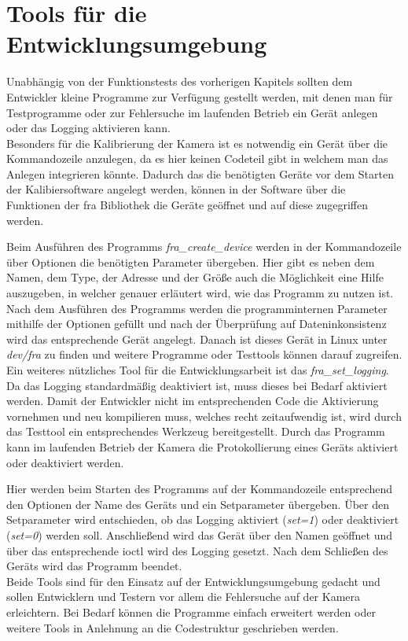  
\section{Tools für die Entwicklungsumgebung}
Unabhängig von der Funktionstests des vorherigen Kapitels sollten dem Entwickler kleine Programme zur Verfügung gestellt werden, mit denen man für Testprogramme oder zur Fehlersuche im laufenden Betrieb ein Gerät anlegen oder das Logging aktivieren kann.\\


Besonders für die Kalibrierung der Kamera ist es notwendig ein Gerät über die Kommandozeile anzulegen, da es hier keinen Codeteil gibt in welchem man das Anlegen integrieren könnte. Dadurch das die benötigten Geräte vor dem Starten der Kalibiersoftware angelegt werden, können in der Software über die Funktionen der \ac{fra} Bibliothek die Geräte geöffnet und auf diese zugegriffen werden.


Beim Ausführen des Programms \textit{fra\_create\_device} werden in der Kommandozeile über Optionen die benötigten Parameter übergeben. Hier gibt es neben dem Namen, dem Type, der Adresse und der Größe auch die Möglichkeit eine Hilfe auszugeben, in welcher genauer erläutert wird, wie das Programm zu nutzen ist. 
Nach dem Ausführen des Programms werden die programminternen Parameter mithilfe der Optionen gefüllt und nach der Überprüfung auf Dateninkonsistenz wird das entsprechende Gerät angelegt. 
Danach ist dieses Gerät in Linux unter \textit{dev/fra} zu finden und weitere Programme oder Testtools können darauf zugreifen.\\

Ein weiteres nützliches Tool für die Entwicklungsarbeit ist das \textit{fra\_set\_logging}. Da das Logging standardmäßig deaktiviert ist, muss dieses bei Bedarf aktiviert werden. Damit der Entwickler nicht im entsprechenden Code die Aktivierung vornehmen und neu kompilieren muss, welches recht zeitaufwendig ist, wird durch das Testtool ein entsprechendes Werkzeug bereitgestellt. Durch das Programm kann im laufenden Betrieb der Kamera die Protokollierung eines Geräts aktiviert oder deaktiviert werden.


Hier werden beim Starten des Programms auf der Kommandozeile entsprechend den Optionen der Name des Geräts und ein Setparameter übergeben. 
Über den Setparameter wird entschieden, ob das Logging aktiviert (\textit{set=1}) oder deaktiviert (\textit{set=0}) werden soll. Anschließend wird das Gerät über den Namen geöffnet und über das entsprechende \ac{ioctl} wird des Logging gesetzt. Nach dem Schließen des Geräts wird das Programm beendet. \\


Beide Tools sind für den Einsatz auf der Entwicklungsumgebung gedacht und sollen Entwicklern und Testern vor allem die Fehlersuche auf der Kamera erleichtern. Bei Bedarf können die Programme einfach erweitert werden oder weitere Tools in Anlehnung an die Codestruktur geschrieben werden. 